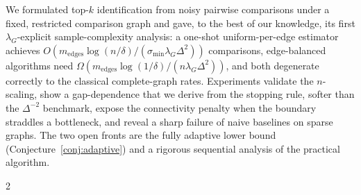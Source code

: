 \documentclass[11pt]{article}
\theoremstyle{definition}
\newcommand{\lG}{\lambda_G}
\begin{document}
We formulated top-$k$ identification from noisy pairwise comparisons under a fixed, restricted comparison graph and gave, to the best of our knowledge, its first $\lG$-explicit sample-complexity analysis: a one-shot uniform-per-edge estimator achieves $O(m_{\mathrm{edges}}\log(n/\delta)/(\sigma_{\min}\lG\Delta^2))$ comparisons, edge-balanced algorithms need $\Omega(m_{\mathrm{edges}}\log(1/\delta)/(n\lG\Delta^2))$, and both degenerate correctly to the classical complete-graph rates.  Experiments validate the $n$-scaling, show a gap-dependence that we derive from the stopping rule, softer than the $\Delta^{-2}$ benchmark, expose the connectivity penalty when the boundary straddles a bottleneck, and reveal a sharp failure of naive baselines on sparse graphs.  The two open fronts are the fully adaptive lower bound (Conjecture~\ref{conj:adaptive}) and a rigorous sequential analysis of the practical algorithm.


\begingroup
\scriptsize
\setlength{\multicolsep}{2pt}
\begin{multicols}{2}


\end{multicols}
\endgroup
\end{document}
